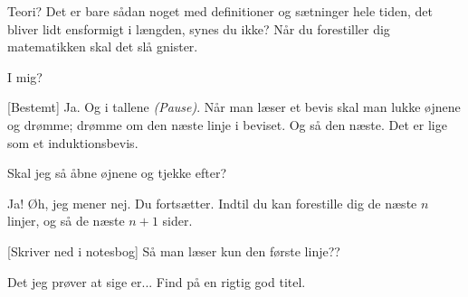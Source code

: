\documentclass[a4paper,11pt]{article}
\begin{document}
\begin{sketch}
 Teori? Det er bare sådan noget med definitioner og sætninger hele tiden, det bliver lidt ensformigt i længden, synes du ikke? Når du forestiller dig matematikken skal det slå gnister.

 I mig?

[Bestemt] Ja. Og i tallene \emph{(Pause)}. Når man læser et bevis skal man lukke øjnene og drømme; drømme om den næste linje i beviset. Og så den næste. Det er lige som et induktionsbevis.

 Skal jeg så åbne øjnene og tjekke efter?

 Ja! Øh, jeg mener nej. Du fortsætter. Indtil du kan forestille dig de næste $n$ linjer, og så de næste $n+1$ sider.

[Skriver ned i notesbog] Så man læser kun den første linje??

 Det jeg prøver at sige er... Find på en rigtig god titel.
\end{sketch}
\end{document}
